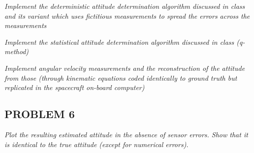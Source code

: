 \textit{Implement the deterministic attitude determination algorithm discussed in class and its variant which uses fictitious measurements to spread the errors across the measurements}

\textit{Implement the statistical attitude determination algorithm discussed in class (q-method)}

\textit{Implement angular velocity measurements and the reconstruction of the attitude from those (through kinematic equations coded identically to ground truth but replicated in the spacecraft on-board computer)}

\subsection{PROBLEM 6}
\textit{Plot the resulting estimated attitude in the absence of sensor errors. Show that it is identical to the true attitude (except for numerical errors).}